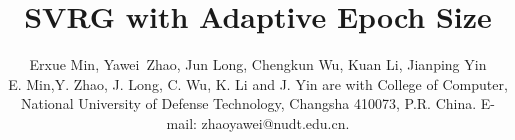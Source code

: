 \documentclass[conference]{IEEEtran}
\begin{document}
%
\title{SVRG with Adaptive Epoch Size}

\author{Erxue Min,
Yawei~Zhao,
Jun Long,
Chengkun Wu,
Kuan Li,
Jianping Yin

\author{
}
\IEEEcompsocitemizethanks
{\IEEEcompsocthanksitem E. Min,Y. Zhao, J. Long, C. Wu, K. Li and J. Yin are with College of Computer, National University of Defense Technology, Changsha 410073, P.R. China. E-mail: zhaoyawei@nudt.edu.cn.
}
}



% 
\end{document}
